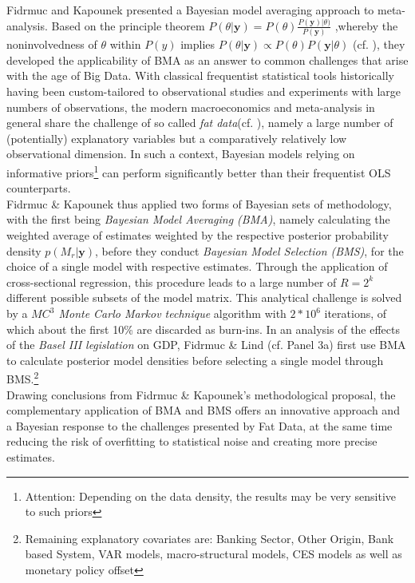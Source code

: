 \documentclass[a4paper,man,natbib]{apa6}
\begin{document}
Fidrmuc and Kapounek presented a Bayesian model averaging approach to meta-analysis. Based on the principle theorem 
$P(\theta|\textbf{y}) = P(\theta)\frac{P(\textbf{y}) |\theta)}{P(\textbf{y})}$ 
,whereby the noninvolvedness of $\theta$  within $P(y)$ implies
$P(\theta|\textbf{y}) \propto P(\theta )P(\textbf{y} |\theta)$ (cf. \cite{Gelman2014}), 
they developed the applicability of BMA as an answer to common challenges that arise with the age of Big Data. With classical frequentist statistical tools historically having been custom-tailored to observational studies and experiments with large numbers of observations, the modern macroeconomics and meta-analysis in general share the challenge of so called \textit{fat data}(cf. \cite{Varian2014a}), namely a large number of (potentially) explanatory variables but a comparatively relatively low observational dimension. In such a context, Bayesian models relying on informative priors\footnote[1]{Attention: Depending on the data density, the results may be very sensitive to such priors} can perform significantly better than their frequentist OLS counterparts.\\
Fidrmuc \& Kapounek thus applied two forms of Bayesian sets of methodology, with the first being \textit{Bayesian Model Averaging (BMA)}, namely calculating the weighted average of estimates weighted by the respective posterior probability density $p(M_r|\textbf{y})$, before they conduct \textit{Bayesian Model Selection (BMS)}, for the choice of a single model with respective estimates.
Through the application of cross-sectional regression, this procedure leads to a large number of $R = 2^k$ different possible subsets of the model matrix. This analytical challenge is solved by a \textit{$MC^3$ Monte Carlo Markov technique} algorithm with $2*10^6$ iterations, of which about the first 10\% are discarded as burn-ins. In an analysis of the effects of the \textit{Basel III legislation} on GDP, Fidrmuc \& Lind (cf. Panel 3a) first use BMA to calculate posterior model densities before selecting a single model through BMS.\footnote[2]{Remaining explanatory covariates are: Banking Sector, Other Origin, Bank based System, VAR models, macro-structural models, CES models as well as monetary policy offset} \\Drawing conclusions from Fidrmuc \& Kapounek's methodological proposal, the complementary application of BMA and BMS offers an innovative approach and a Bayesian response to the challenges presented by Fat Data, at the same time reducing the risk of overfitting to statistical noise and creating more precise estimates. 
\end{document}
